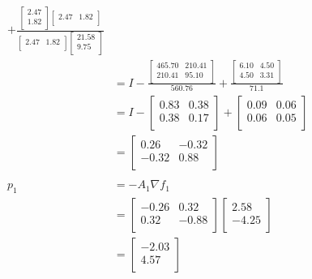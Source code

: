 \documentclass{article}
\begin{document}
\begin{align*}
  + \frac{\begin{bmatrix} 2.47 \\ 1.82 \\ \end{bmatrix} \begin{bmatrix} 2.47 & 1.82 \\ \end{bmatrix}}{\begin{bmatrix} 2.47 & 1.82 \\ \end{bmatrix} \begin{bmatrix} 21.58 \\ 9.75 \\ \end{bmatrix}} &&\\
  &= I
  - \frac{\begin{bmatrix} 
    465.70 & 210.41 \\
    210.41 & 95.10 \\
    \end{bmatrix}}{560.76}  
  + \frac{\begin{bmatrix} 
    6.10 & 4.50 \\
    4.50 & 3.31 \\
    \end{bmatrix}}{71.1} &&\\
    &= I
  - \begin{bmatrix} 
    0.83 & 0.38 \\
    0.38 & 0.17 \\
    \end{bmatrix}
  + \begin{bmatrix} 
    0.09 & 0.06 \\
    0.06 & 0.05 \\
    \end{bmatrix} &&\\
  &= \begin{bmatrix} 
    0.26 & -0.32 \\
    -0.32 & 0.88 \\
    \end{bmatrix} &&\\
  &&\\
  p_1 &= -A_1 \nabla f_1 &&\\
  &= \begin{bmatrix} 
    -0.26 & 0.32 \\
    0.32 & -0.88 \\
    \end{bmatrix} 
    \begin{bmatrix} 
    2.58 \\
    -4.25 \\
    \end{bmatrix}
  &&\\
  &= \begin{bmatrix} 
    -2.03 \\
    4.57 \\
    \end{bmatrix}
  &&\\
\end{align*}
\newline
\end{document}
